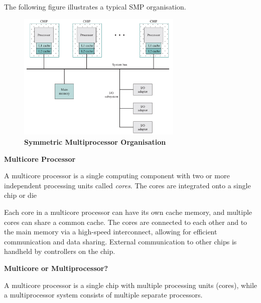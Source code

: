 \documentclass{article}
\begin{document}
The following figure illustrates a typical SMP organisation.
\begin{figure}[!h]
    \centering
    \includegraphics[width=0.7\textwidth]{figures/Ch01Figure10.png} %
    \caption{\textbf{Symmetric Multiprocessor Organisation}}
    \label{fig:Ch01Fig10}
\end{figure}

\begin{definitionbox}
    \textbf{Multicore Processor}

    A multicore processor is a single computing component with two or more independent processing 
    units called \textit{cores}. The cores are integrated onto a single chip or die
\end{definitionbox}

Each core in a multicore processor can have its own cache memory, and multiple cores can share a common cache.
The cores are connected to each other and to the main memory via a high-speed interconnect, allowing for efficient communication and data sharing.
External communication to other chips is handheld by controllers on the chip.

\begin{notebox}
    \textbf{Multicore or Multiprocessor?}

    A multicore processor is a single chip with multiple processing units (cores), 
    while a multiprocessor system consists of multiple separate processors.

\end{notebox}
\end{document}
